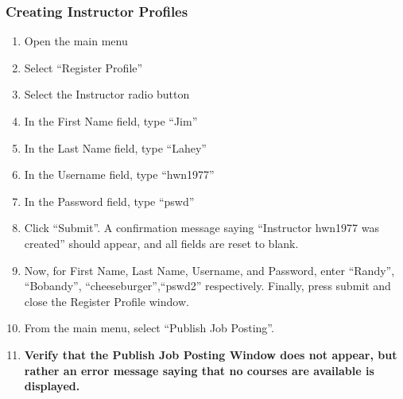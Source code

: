 \documentclass[12pt]{report}
\begin{document}
\subsubsection{Creating Instructor Profiles}
\begin{enumerate}
	\item Open the main menu
	\item Select ``Register Profile''
	\item Select the Instructor radio button
	\item In the First Name field, type ``Jim''
	\item In the Last Name field, type ``Lahey''
	\item In the Username field, type ``hwn1977''
	\item In the Password field, type ``pswd''
	\item Click ``Submit''. A confirmation message saying ``Instructor hwn1977 was created'' should
		appear, and all fields are reset to blank.
	\item Now, for First Name, Last Name, Username, and Password, enter ``Randy'', ``Bobandy'',
		``cheeseburger'',``pswd2'' respectively. Finally, press submit and close the Register
		Profile window.
	\item From the main menu, select ``Publish Job Posting''.
	\item \textbf{Verify that the Publish Job Posting Window does not appear, but rather an error
		message saying that no courses are available is displayed.}
\end{enumerate}
\end{document}
